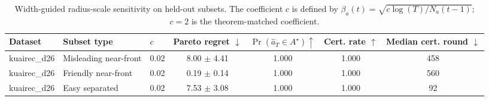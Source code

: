 \begin{table}[t]
\centering
\caption{Width-guided radius-scale sensitivity on held-out subsets. The coefficient $c$ is defined by $\beta_a(t)=\sqrt{c\log(T)/N_a(t-1)}$; $c=2$ is the theorem-matched coefficient.}
\label{tab:app-width-sensitivity}
\scriptsize
\setlength{\tabcolsep}{3pt}
\begin{tabular}{lllcccc}
\toprule
Dataset & Subset type & $c$ & Pareto regret $\downarrow$ & $\Pr(\widehat a_T\in A^\star)\uparrow$ & Cert. rate $\uparrow$ & Median cert. round $\downarrow$ \\
\midrule
kuairec\_d26 & Misleading near-front & 0.02 & 8.00 $\pm$ 4.41 & 1.000 & 1.000 & 458 \\
\midrule
kuairec\_d26 & Friendly near-front & 0.02 & 0.19 $\pm$ 0.14 & 1.000 & 1.000 & 560 \\
\midrule
kuairec\_d26 & Easy separated & 0.02 & 7.53 $\pm$ 3.08 & 1.000 & 1.000 & 92 \\
\bottomrule
\end{tabular}
\end{table}
